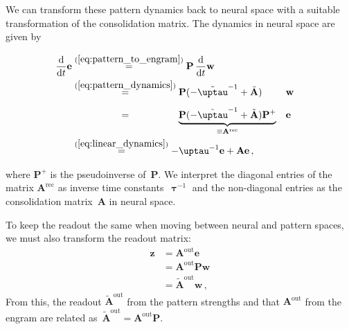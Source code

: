We can transform these pattern dynamics back to neural space with a suitable transformation of the consolidation matrix. The dynamics in neural space are given by

\begin{equation}\label{eq:transform_pattern_to_neural}
  \begin{aligned}
    \frac{\mathrm{d}}{\mathrm{d}t} \mathbf{e}
    &\stackrel{(\ref{eq:pattern_to_engram})}{=} \mathbf{P} \, \frac{\mathrm{d}}{\mathrm{d}t} \mathbf{w} \\ 
    &\stackrel{(\ref{eq:pattern_dynamics})}{=} \mathbf{P} (-\tilde{\boldsymbol{\uptau}}^{-1} + \tilde{\mathbf{A}} )&&\mathbf{w} \\
    &\stackrel{\phantom{(\ref{eq:pattern_dynamics})}}{=} \underbrace{\mathbf{P} (-\tilde{\boldsymbol{\uptau}}^{-1} + \tilde{\mathbf{A}}) \mathbf{P}^{+}}_{\equiv \mathbf{A}^{\text{rec}}} &&\mathbf{e} \\
    &\stackrel{(\ref{eq:linear_dynamics})}{=} -\boldsymbol{\uptau}^{-1} \mathbf{e} + \mathbf{A} \mathbf{e}\,,
  \end{aligned}
\end{equation}

where $\mathbf{P}^{+}$ is the pseudoinverse of~$\mathbf{P}$. We interpret the diagonal entries of the matrix $\mathbf{A}^{\text{rec}}$ as inverse time constants~$\boldsymbol{\uptau}^{-1}$ and the non-diagonal entries as the consolidation matrix~$\mathbf{A}$ in neural space.

To keep the readout the same when moving between neural and pattern spaces, we must also transform the readout matrix:
\begin{equation*}
\begin{split}
    \mathbf{z} 	& = \mathbf{A}^{\text{out}} \mathbf{e} \\
    			& = \mathbf{A}^{\text{out}} \mathbf{P} \mathbf{w} \\
			& = \tilde{\mathbf{A}}^\text{out} \mathbf{w} \,,
\end{split}
\end{equation*}
From this, the readout $\tilde{\mathbf{A}}^\text{out}$ from the pattern strengths and that $\mathbf{A}^\text{out}$ from the engram are related as~$\tilde{\mathbf{A}}^\text{out} = \mathbf{A}^{\text{out}} \mathbf{P}$.

